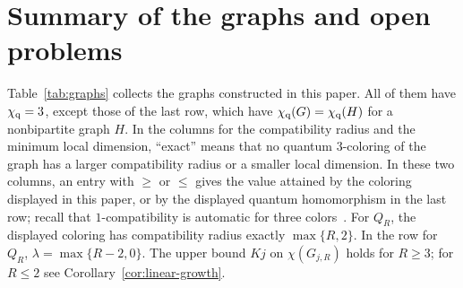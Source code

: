 \section{Summary of the graphs and open problems}\label{sec:discussion}

Table~\ref{tab:graphs} collects the graphs constructed in this paper. All of them have $\chi_{\mathrm q}=3$, except those of the last row, which have $\chi_{\mathrm q}(G)=\chi_{\mathrm q}(H)$ for a nonbipartite graph $H$. In the columns for the compatibility radius and the minimum local dimension, ``exact'' means that no quantum $3$-coloring of the graph has a larger compatibility radius or a smaller local dimension. In these two columns, an entry with $\ge$ or $\le$ gives the value attained by the coloring displayed in this paper, or by the displayed quantum homomorphism in the last row; recall that $1$-compatibility is automatic for three colors~\cite{Ji}. For $Q_R$, the displayed coloring has compatibility radius exactly $\max\{R,2\}$. In the row for $Q_R$, $\lambda=\max\{R-2,0\}$. The upper bound $Kj$ on $\chi(G_{j,R})$ holds for $R\ge3$; for $R\le2$ see Corollary~\ref{cor:linear-growth}.

